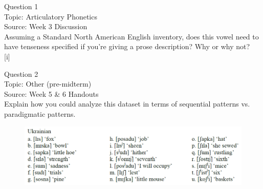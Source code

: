 \documentclass[12pt]{article}
\begin{document}
\begin{center}
\textbf{{\color{blue}{\HUGE START OF EXAM\\}}}

\textbf{{\color{blue}{\HUGE Student ID: 70875\\}}}

\textbf{{\color{blue}{\HUGE 4:30\\}}}

\end{center}
\newpage

{\large Question 1}\\

Topic: Articulatory Phonetics\\
Source: Week 3 Discussion\\

Assuming a Standard North American English inventory, does this vowel need to have tenseness specified if you're giving a prose description? Why or why not?\\

{[i]}


\newpage

{\large Question 2}\\

Topic: Other (pre-midterm)\\
Source: Week 5 \& 6 Handouts\\

Explain how you could analyze this dataset in terms of sequential patterns vs. paradigmatic patterns.\\

\begin{figure}[H]
\includegraphics{../images/ukrainian.png}
\end{figure}

\newpage

\begin{center}
\textbf{{\color{red}{\HUGE END OF EXAM}}}\\

\end{center}
\newpage

\begin{center}
\textbf{{\color{blue}{\HUGE START OF EXAM\\}}}

\textbf{{\color{blue}{\HUGE Student ID: 12377\\}}}

\textbf{{\color{blue}{\HUGE 4:40\\}}}

\end{center}
\newpage
\end{document}
